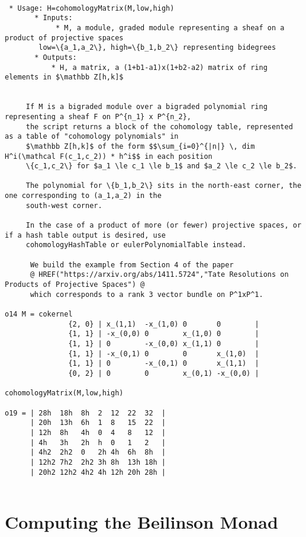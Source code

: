 \documentclass[twoside,12pt, leqno]{amsart}
\begin{document}
\begin{verbatim}
 
 * Usage: H=cohomologyMatrix(M,low,high)
       * Inputs:
            * M, a module, graded module representing a sheaf on a product of projective spaces
        low=\{a_1,a_2\}, high=\{b_1,b_2\} representing bidegrees
       * Outputs:
           * H, a matrix, a (1+b1-a1)x(1+b2-a2) matrix of ring elements in $\mathbb Z[h,k]$

 
     If M is a bigraded module over a bigraded polynomial ring representing a sheaf F on P^{n_1} x P^{n_2},
     the script returns a block of the cohomology table, represented as a table of "cohomology polynomials" in
     $\mathbb Z[h,k]$ of the form $$\sum_{i=0}^{|n|} \, dim H^i(\mathcal F(c_1,c_2)) * h^i$$ in each position
     \{c_1,c_2\} for $a_1 \le c_1 \le b_1$ and $a_2 \le c_2 \le b_2$. 
     
     The polynomial for \{b_1,b_2\} sits in the north-east corner, the one corresponding to (a_1,a_2) in the
     south-west corner.

     In the case of a product of more (or fewer) projective spaces, or if a hash table output is desired, use
     cohomologyHashTable or eulerPolynomialTable instead.

      We build the example from Section 4 of the paper
      @ HREF("https://arxiv.org/abs/1411.5724","Tate Resolutions on Products of Projective Spaces") @
      which corresponds to a rank 3 vector bundle on P^1xP^1. 

o14 M = cokernel 
               {2, 0} | x_(1,1)  -x_(1,0) 0       0        |
               {1, 1} | -x_(0,0) 0        x_(1,0) 0        |
               {1, 1} | 0        -x_(0,0) x_(1,1) 0        |
               {1, 1} | -x_(0,1) 0        0       x_(1,0)  |
               {1, 1} | 0        -x_(0,1) 0       x_(1,1)  |
               {0, 2} | 0        0        x_(0,1) -x_(0,0) |
   
cohomologyMatrix(M,low,high)

o19 = | 28h  18h  8h  2  12  22  32  |
      | 20h  13h  6h  1  8   15  22  |
      | 12h  8h   4h  0  4   8   12  |
      | 4h   3h   2h  h  0   1   2   |
      | 4h2  2h2  0   2h 4h  6h  8h  |
      | 12h2 7h2  2h2 3h 8h  13h 18h |
      | 20h2 12h2 4h2 4h 12h 20h 28h |   
      
    \end{verbatim}


     
\section{Computing the Beilinson Monad}
\end{document}
